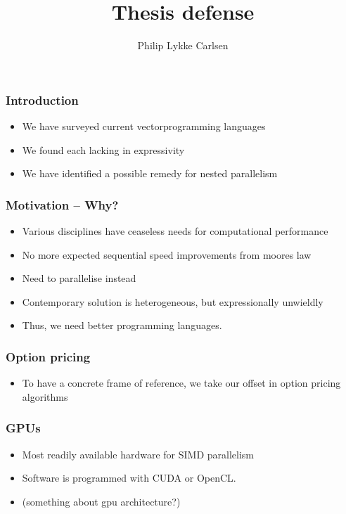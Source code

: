 \documentclass[a4paper]{beamer}
\title{Thesis defense}
\author{Philip Lykke Carlsen}
\begin{document}
\begin{frame}
\titlepage
\end{frame}

\begin{frame}
  \frametitle{Introduction}
  \begin{itemize}
    \item We have surveyed current vectorprogramming languages
    \item We found each lacking in expressivity
    \item We have identified a possible remedy for nested parallelism
  \end{itemize}

\end{frame}

\begin{frame}
  \frametitle{Motivation -- Why?}
  \begin{itemize}
    \item Various disciplines have ceaseless needs for computational performance
    \item No more expected sequential speed improvements from moores law
    \item Need to parallelise instead
    \item Contemporary solution is heterogeneous, but expressionally unwieldly
    \item Thus, we need better programming languages.
    \end{itemize}

\end{frame}

\begin{frame}
  \frametitle{Option pricing}
  \begin{itemize}
    \item To have a concrete frame of reference, we take our offset in option pricing algorithms
  \end{itemize}
\end{frame}

\begin{frame}
  \frametitle{GPUs}
  \begin{itemize}
    \item Most readily available hardware for SIMD parallelism
    \item Software is programmed with CUDA or OpenCL.
    \item (something about gpu architecture?)
  \end{itemize}
\end{frame}
\end{document}
